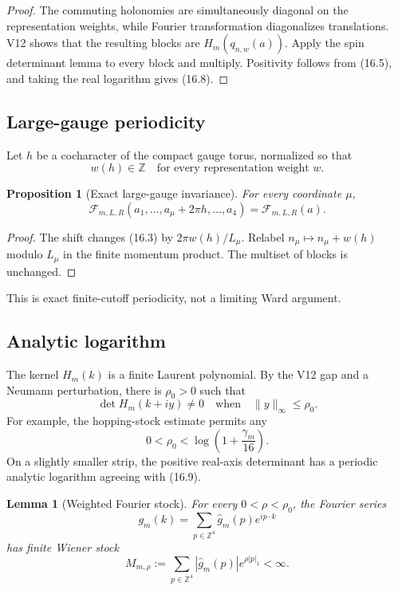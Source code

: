 \documentclass[11pt]{article}
\newtheorem{lemma}[theorem]{Lemma}
\newtheorem{proposition}[theorem]{Proposition}
\begin{document}
\begin{proof}
The commuting holonomies are simultaneously diagonal on the representation
weights, while Fourier transformation diagonalizes translations.
V12 shows that the resulting blocks are \(H_m(q_{n,w}(a))\).
Apply the spin determinant lemma to every block and multiply.  Positivity
follows from (16.5), and taking the real logarithm gives (16.8).
\end{proof}

\subsection{Large-gauge periodicity}

Let \(h\) be a cocharacter of the compact gauge torus, normalized so that
\[
 w(h)\in\mathbb Z
 \quad\text{for every representation weight }w.
 \tag{16.10}
\]

\begin{proposition}[Exact large-gauge invariance]
\label{prop:v11v16-large-gauge}
For every coordinate \(\mu\),
\[
 \mathcal F_{m,L,R}
 (a_1,\ldots,a_\mu+2\pi h,\ldots,a_4)
 =
 \mathcal F_{m,L,R}(a).
 \tag{16.11}
\]
\end{proposition}

\begin{proof}
The shift changes (16.3) by
\(2\pi w(h)/L_\mu\).  Relabel
\(n_\mu\mapsto n_\mu+w(h)\) modulo \(L_\mu\) in the finite momentum
product.  The multiset of blocks is unchanged.
\end{proof}

This is exact finite-cutoff periodicity, not a limiting Ward argument.

\subsection{Analytic logarithm}

The kernel \(H_m(k)\) is a finite Laurent polynomial.  By the V12 gap and
a Neumann perturbation, there is \(\rho_0>0\) such that
\[
 \det H_m(k+iy)\ne0
 \quad\text{when}\quad
 \|y\|_\infty\leq\rho_0.
 \tag{16.12}
\]
For example, the hopping-stock estimate permits any
\[
 0<\rho_0<
 \log\left(1+\frac{\gamma_m}{16}\right).
 \tag{16.13}
\]
On a slightly smaller strip, the positive real-axis determinant has a
periodic analytic logarithm agreeing with (16.9).

\begin{lemma}[Weighted Fourier stock]
\label{lem:v11v16-fourier-stock}
For every \(0<\rho<\rho_0\), the Fourier series
\[
 g_m(k)=\sum_{p\in\mathbb Z^4}\widehat g_m(p)e^{ip\cdot k}
 \tag{16.14}
\]
has finite Wiener stock
\[
 M_{m,\rho}:=
 \sum_{p\in\mathbb Z^4}
 |\widehat g_m(p)|e^{\rho|p|_1}<\infty.
 \tag{16.15}
\]
\end{lemma}
\end{document}
